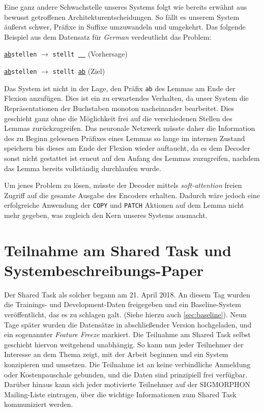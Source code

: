 \documentclass[11pt,a4paper]{article}
\newcommand{\lang}[1]{\textit{#1}}
\newcommand{\action}[1]{\texttt{#1}}
\begin{document}
Eine ganz andere Schwachstelle unseres Systems folgt wie bereits erwähnt aus bewusst getroffenen Architekturentscheidungen.
So fällt es unserem System äußerst schwer, Präfixe in Suffixe umzuwandeln und umgekehrt. Das folgende Beispiel aus dem Datensatz für \lang{German} verdeutlicht das Problem:
\begin{compactitem}
	\item \texttt{\underline{ab}stellen} $\to$ \texttt{stellt \underline{\ \ }} (Vorhersage)
    \item \texttt{\underline{ab}stellen} $\to$ \texttt{stellt \underline{ab}} (Ziel)
\end{compactitem}
Das System ist nicht in der Lage, den Präfix \texttt{ab} des Lemmas am Ende der Flexion anzufügen.
Dies ist ein zu erwartendes Verhalten, da unser System die Repräsentationen der Buchstaben monoton nacheinander bearbeitet. Dies geschieht ganz ohne die Möglichkeit frei auf die verschiedenen Stellen des Lemmas zurückzugreifen.
Das neuronale Netzwerk müsste daher die Information des zu Beginn gelesenen Präfixes eines Lemmas so lange im internen Zustand speichern bis dieses am Ende der Flexion wieder auftaucht, da es dem Decoder sonst nicht gestattet ist erneut auf den Anfang des Lemmas zuzugreifen, nachdem das Lemma bereits vollständig durchlaufen wurde.

Um jenes Problem zu lösen, müsste der Decoder mittels \textit{soft-attention} freien Zugriff auf die gesamte Ausgabe des Encoders erhalten. Dadurch wäre jedoch eine erfolgreiche Anwendung der \action{COPY} und \action{PATCH} Aktionen auf dem Lemma nicht mehr gegeben, was zugleich den Kern unseres Systems ausmacht.

\section{Teilnahme am Shared Task und Systembeschreibungs-Paper}
\label{sec:paper}

Der Shared Task als solcher begann am 21. April 2018. An diesem Tag wurden die Trainings- und Development-Daten freigegeben und ein Baseline-System veröffentlicht, das es zu schlagen galt. (Siehe hierzu auch \autoref{sec:baseline}). Neun Tage später wurden die Datensätze in abschließender Version hochgeladen, und ein sogenannter \textit{Feature Freeze} markiert.
Die Teilnahme am Shared Task selbst geschieht hiervon weitgehend unabhängig. So kann nun jeder Teilnehmer der Interesse an dem Thema zeigt, mit der Arbeit beginnen und ein System konzipieren und umsetzen. Die Teilnahme ist an keine verbindliche Anmeldung oder Kostenpauschale gebunden, und die Daten sind prinzipiell frei verfügbar. Darüber hinaus kann sich jeder motivierte Teilnehmer auf der SIGMORPHON Mailing-Liste eintragen, über die wichtige Informationen zum Shared Task kommuniziert werden.
\end{document}
